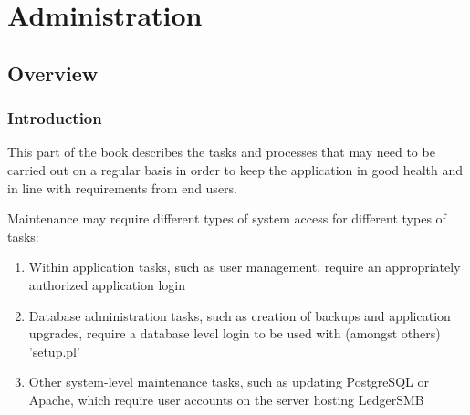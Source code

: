 
\part{Administration}
\label{part-administration}

%

\chapter{Overview}
\label{cha-administration-overview}

\section{Introduction}
\label{sec-administration-introduction}

This part of the book describes the tasks and processes that may need to be carried out
on a regular basis in order to keep the application in good health and in line with
requirements from end users.

Maintenance may require different types of system access for different types of tasks:

\begin{enumerate}
\item Within application tasks, such as user management, require an appropriately authorized
   application login
\item Database administration tasks, such as creation of backups  and application upgrades,
   require a database level login to be used with (amongst others) 'setup.pl'
\item Other system-level maintenance tasks, such as updating PostgreSQL or Apache, which
   require user accounts on the server hosting LedgerSMB
\end{enumerate}


